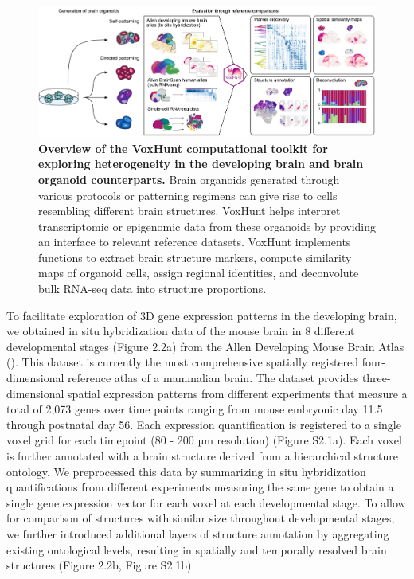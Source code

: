 \begin{figure}[b!]
    \centering
	\includegraphics[width=\textwidth]{figures/voxhunt/Figure_1}
    \caption{\textbf{Overview of the VoxHunt computational toolkit for exploring heterogeneity in the developing brain and brain organoid counterparts.}
    Brain organoids generated through various protocols or patterning regimens can give rise to cells resembling different brain structures. VoxHunt helps interpret transcriptomic or epigenomic data from these organoids by providing an interface to relevant reference datasets. VoxHunt implements functions to extract brain structure markers, compute similarity maps of organoid cells, assign regional identities, and deconvolute bulk RNA-seq data into structure proportions.}
    \label{fig:vox1}
\end{figure}


To facilitate exploration of 3D gene expression patterns in the developing brain, we obtained in situ hybridization data of the mouse brain in 8 different developmental stages (Figure 2.2a) from the Allen Developing Mouse Brain Atlas (\cite{thompson_high-resolution_2014}). This dataset is currently the most comprehensive spatially registered four-dimensional reference atlas of a mammalian brain. The dataset provides three-dimensional spatial expression patterns from different experiments that measure a total of 2,073 genes over time points ranging from mouse embryonic day 11.5 through postnatal day 56. Each expression quantification is registered to a single voxel grid for each timepoint (80 - 200 µm resolution) (Figure S2.1a). Each voxel is further annotated with a brain structure derived from a hierarchical structure ontology. We preprocessed this data by summarizing in situ hybridization quantifications from different experiments measuring the same gene to obtain a single gene expression vector for each voxel at each developmental stage. To allow for comparison of structures with similar size throughout developmental stages, we further introduced additional layers of structure annotation by aggregating existing ontological levels, resulting in spatially and temporally resolved brain structures (Figure 2.2b, Figure S2.1b).


